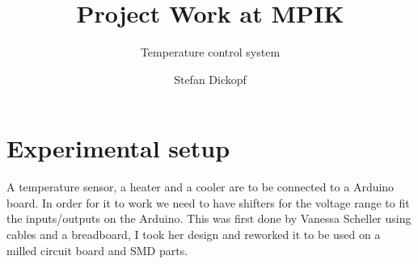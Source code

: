\documentclass[12pt]{scrartcl}
\begin{document}
  \title{Project Work at MPIK}
  \subtitle{Temperature control system}
  \date{}
  \author{Stefan Dickopf}
  \maketitle

  \section{Experimental setup}
    A temperature sensor, a heater and a cooler are to be connected to a Arduino
    board. In order for it to work we need to have shifters for the voltage
    range to fit the inputs/outputs on the Arduino. This was first done by
    Vanessa Scheller using cables and a breadboard, I took her design and
    reworked it to be used on a milled circuit board and SMD parts.
\end{document}
